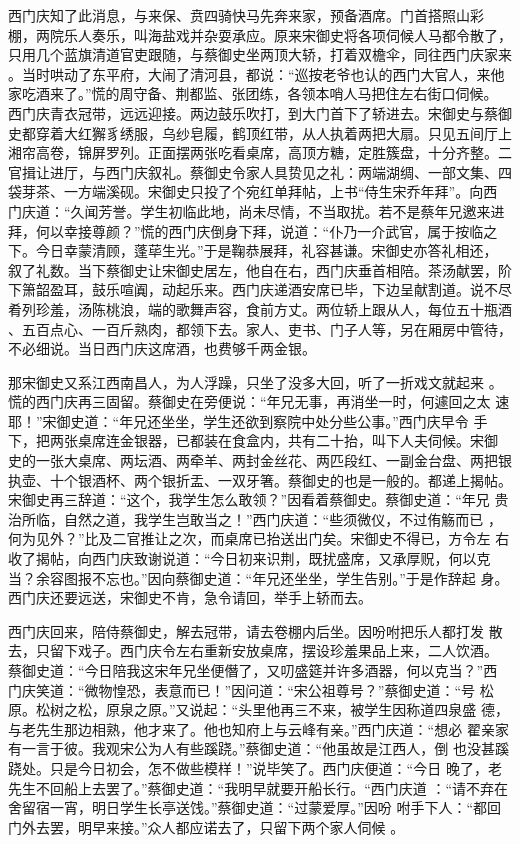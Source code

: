 西门庆知了此消息，与来保、贲四骑快马先奔来家，预备酒席。门首搭照山彩
棚，两院乐人奏乐，叫海盐戏并杂耍承应。原来宋御史将各项伺候人马都令散了，
只用几个蓝旗清道官吏跟随，与蔡御史坐两顶大轿，打着双檐伞，同往西门庆家来
。当时哄动了东平府，大闹了清河县，都说：“巡按老爷也认的西门大官人，来他
家吃酒来了。”慌的周守备、荆都监、张团练，各领本哨人马把住左右街口伺候。
西门庆青衣冠带，远远迎接。两边鼓乐吹打，到大门首下了轿进去。宋御史与蔡御
史都穿着大红獬豸绣服，乌纱皂履，鹤顶红带，从人执着两把大扇。只见五间厅上
湘帘高卷，锦屏罗列。正面摆两张吃看桌席，高顶方糖，定胜簇盘，十分齐整。二
官揖让进厅，与西门庆叙礼。蔡御史令家人具贽见之礼：两端湖绸、一部文集、四
袋芽茶、一方端溪砚。宋御史只投了个宛红单拜帖，上书“侍生宋乔年拜”。向西
门庆道：“久闻芳誉。学生初临此地，尚未尽情，不当取扰。若不是蔡年兄邀来进
拜，何以幸接尊颜？”慌的西门庆倒身下拜，说道：“仆乃一介武官，属于按临之
下。今日幸蒙清顾，蓬荜生光。”于是鞠恭展拜，礼容甚谦。宋御史亦答礼相还，
叙了礼数。当下蔡御史让宋御史居左，他自在右，西门庆垂首相陪。茶汤献罢，阶
下箫韶盈耳，鼓乐喧阗，动起乐来。西门庆递酒安席已毕，下边呈献割道。说不尽
肴列珍羞，汤陈桃浪，端的歌舞声容，食前方丈。两位轿上跟从人，每位五十瓶酒
、五百点心、一百斤熟肉，都领下去。家人、吏书、门子人等，另在厢房中管待，
不必细说。当日西门庆这席酒，也费够千两金银。

那宋御史又系江西南昌人，为人浮躁，只坐了没多大回，听了一折戏文就起来
。慌的西门庆再三固留。蔡御史在旁便说：“年兄无事，再消坐一时，何遽回之太
速耶！”宋御史道：“年兄还坐坐，学生还欲到察院中处分些公事。”西门庆早令
手下，把两张桌席连金银器，已都装在食盒内，共有二十抬，叫下人夫伺候。宋御
史的一张大桌席、两坛酒、两牵羊、两封金丝花、两匹段红、一副金台盘、两把银
执壶、十个银酒杯、两个银折盂、一双牙箸。蔡御史的也是一般的。都递上揭帖。
宋御史再三辞道：“这个，我学生怎么敢领？”因看着蔡御史。蔡御史道：“年兄
贵治所临，自然之道，我学生岂敢当之！”西门庆道：“些须微仪，不过侑觞而已
，何为见外？”比及二官推让之次，而桌席已抬送出门矣。宋御史不得已，方令左
右收了揭帖，向西门庆致谢说道：“今日初来识荆，既扰盛席，又承厚贶，何以克
当？余容图报不忘也。”因向蔡御史道：“年兄还坐坐，学生告别。”于是作辞起
身。西门庆还要远送，宋御史不肯，急令请回，举手上轿而去。

西门庆回来，陪侍蔡御史，解去冠带，请去卷棚内后坐。因吩咐把乐人都打发
散去，只留下戏子。西门庆令左右重新安放桌席，摆设珍羞果品上来，二人饮酒。
蔡御史道：“今日陪我这宋年兄坐便僭了，又叨盛筵并许多酒器，何以克当？”西
门庆笑道：“微物惶恐，表意而已！”因问道：“宋公祖尊号？”蔡御史道：“号
松原。松树之松，原泉之原。”又说起：“头里他再三不来，被学生因称道四泉盛
德，与老先生那边相熟，他才来了。他也知府上与云峰有亲。”西门庆道：“想必
翟亲家有一言于彼。我观宋公为人有些蹊跷。”蔡御史道：“他虽故是江西人，倒
也没甚蹊跷处。只是今日初会，怎不做些模样！”说毕笑了。西门庆便道：“今日
晚了，老先生不回船上去罢了。”蔡御史道：“我明早就要开船长行。“西门庆道
：“请不弃在舍留宿一宵，明日学生长亭送饯。”蔡御史道：“过蒙爱厚。”因吩
咐手下人：“都回门外去罢，明早来接。”众人都应诺去了，只留下两个家人伺候
。

